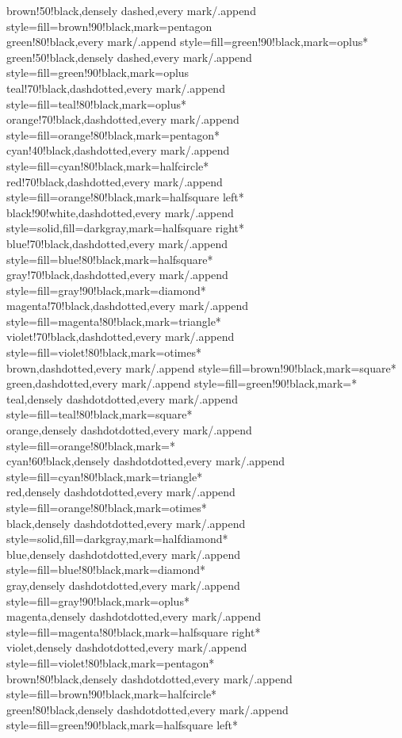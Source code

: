 \documentclass[a4paper]{article}
\begin{document}
{	brown!50!black,densely dashed,every mark/.append style={fill=brown!90!black},mark=pentagon\\
	green!80!black,every mark/.append style={fill=green!90!black},mark=oplus*\\
	green!50!black,densely dashed,every mark/.append style={fill=green!90!black},mark=oplus\\
	teal!70!black,dashdotted,every mark/.append style={fill=teal!80!black},mark=oplus*\\
	orange!70!black,dashdotted,every mark/.append style={fill=orange!80!black},mark=pentagon*\\
	cyan!40!black,dashdotted,every mark/.append style={fill=cyan!80!black},mark=halfcircle*\\
	red!70!black,dashdotted,every mark/.append style={fill=orange!80!black},mark=halfsquare left*\\
	black!90!white,dashdotted,every mark/.append style={solid,fill=darkgray},mark=halfsquare right*\\
	blue!70!black,dashdotted,every mark/.append style={fill=blue!80!black},mark=halfsquare*\\
	gray!70!black,dashdotted,every mark/.append style={fill=gray!90!black},mark=diamond*\\
	magenta!70!black,dashdotted,every mark/.append style={fill=magenta!80!black},mark=triangle*\\
	violet!70!black,dashdotted,every mark/.append style={fill=violet!80!black},mark=otimes*\\
	brown,dashdotted,every mark/.append style={fill=brown!90!black},mark=square*\\
	green,dashdotted,every mark/.append style={fill=green!90!black},mark=*\\
	teal,densely dashdotdotted,every mark/.append style={fill=teal!80!black},mark=square*\\
	orange,densely dashdotdotted,every mark/.append style={fill=orange!80!black},mark=*\\
	cyan!60!black,densely dashdotdotted,every mark/.append style={fill=cyan!80!black},mark=triangle*\\
	red,densely dashdotdotted,every mark/.append style={fill=orange!80!black},mark=otimes*\\
	black,densely dashdotdotted,every mark/.append style={solid,fill=darkgray},mark=halfdiamond*\\
	blue,densely dashdotdotted,every mark/.append style={fill=blue!80!black},mark=diamond*\\
	gray,densely dashdotdotted,every mark/.append style={fill=gray!90!black},mark=oplus*\\
	magenta,densely dashdotdotted,every mark/.append style={fill=magenta!80!black},mark=halfsquare right*\\
	violet,densely dashdotdotted,every mark/.append style={fill=violet!80!black},mark=pentagon*\\
	brown!80!black,densely dashdotdotted,every mark/.append style={fill=brown!90!black},mark=halfcircle*\\
	green!80!black,densely dashdotdotted,every mark/.append style={fill=green!90!black},mark=halfsquare left*\\
}
\end{document}
